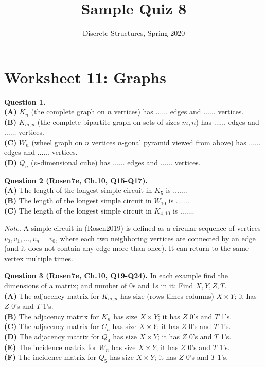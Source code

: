 \documentclass[jou]{apa6}
\title{Sample Quiz 8}
\author{Discrete Structures, Spring 2020}
\affiliation{RBS}
\begin{document}

\twocolumn
\section{Worksheet 11: Graphs}

{\bf Question 1.}\\
{\bf (A)} $K_n$ (the complete graph on $n$ vertices) has $\ldots\ldots$ edges and $\ldots\ldots$ vertices.\\
{\bf (B)} $K_{m,n}$ (the complete bipartite graph on sets of sizes $m,n$) has $\ldots\ldots$ edges and $\ldots\ldots$ vertices.\\
{\bf (C)} $W_n$ (wheel graph on $n$ vertices \textendash{} $n$-gonal pyramid
viewed from above) has $\ldots\ldots$ edges and $\ldots\ldots$ vertices.\\
{\bf (D)} $Q_n$ ($n$-dimensional cube) has $\ldots\ldots$ edges and $\ldots\ldots$ vertices.

\vspace{10pt}
{\bf Question 2 (Rosen7e, Ch.10, Q15-Q17).}\\
{\bf (A)} The length of the longest simple circuit in $K_5$ is $\ldots\ldots$.\\
{\bf (B)} The length of the longest simple circuit in $W_{10}$ is $\ldots\ldots$.\\
{\bf (C)} The length of the longest simple circuit in $K_{4,10}$ is $\ldots\ldots$.

{\em Note.} A simple circuit in (Rosen2019) is defined as a circular
sequence of vertices $v_0,v_1,\ldots,v_n=v_0$, 
where each two neighboring vertices are connected by an edge
(and it does not contain any edge more than once).
It can return to the same vertex multiple times.

\vspace{10pt}
{\bf Question 3 (Rosen7e, Ch.10, Q19-Q24).} In each example find 
the dimensions of a matrix; and number of 0s and 1s in it: Find $X,Y,Z,T$.\\
{\bf (A)} The adjacency matrix for $K_{m,n}$ has size (rows times columns)
$X \times Y$; it has $Z$ 0's and $T$ 1's.\\
{\bf (B)} The adjacency matrix for $K_n$  
has size $X \times Y$; it has $Z$ 0's and $T$ 1's.\\
{\bf (C)} The adjacency matrix for $C_n$  
has size $X \times Y$; it has $Z$ 0's and $T$ 1's.\\
{\bf (D)} The adjacency matrix for $Q_4$  
has size $X \times Y$; it has $Z$ 0's and $T$ 1's.\\
{\bf (E)} The incidence matrix for $W_n$ 
has size $X \times Y$; it has $Z$ 0's and $T$ 1's.\\
{\bf (F)} The incidence matrix for $Q_5$ 
has size $X \times Y$; it has $Z$ 0's and $T$ 1's.
\end{document}

